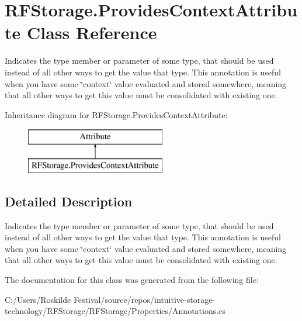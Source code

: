 \section{R\+F\+Storage.\+Provides\+Context\+Attribute Class Reference}
\label{class_r_f_storage_1_1_provides_context_attribute}


Indicates the type member or parameter of some type, that should be used instead of all other ways to get the value that type. This annotation is useful when you have some \char`\"{}context\char`\"{} value evaluated and stored somewhere, meaning that all other ways to get this value must be consolidated with existing one.  


Inheritance diagram for R\+F\+Storage.\+Provides\+Context\+Attribute\+:\begin{figure}[H]
\begin{center}
\leavevmode
\includegraphics[height=2.000000cm]{class_r_f_storage_1_1_provides_context_attribute}
\end{center}
\end{figure}


\subsection{Detailed Description}
Indicates the type member or parameter of some type, that should be used instead of all other ways to get the value that type. This annotation is useful when you have some \char`\"{}context\char`\"{} value evaluated and stored somewhere, meaning that all other ways to get this value must be consolidated with existing one. 


\begin{DoxyCode}{0}
\DoxyCodeLine{}
\DoxyCodeLine{    \textcolor{comment}{//              \string^ Warning: use value of '\_barService' field}}
\DoxyCodeLine{  \}}
\DoxyCodeLine{\}}
\end{DoxyCode}


The documentation for this class was generated from the following file\+:\begin{DoxyCompactItemize}
\item 
C\+:/\+Users/\+Roskilde Festival/source/repos/intuitive-\/storage-\/technology/\+R\+F\+Storage/\+R\+F\+Storage/\+Properties/Annotations.\+cs\end{DoxyCompactItemize}
